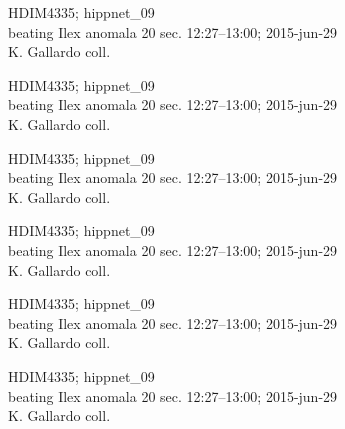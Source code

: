 \documentclass[2pt]{extarticle}
\begin{document}
\noindent
\parbox{0.16\textwidth}{\tiny \raggedright \rule[-0.3\baselineskip]{0pt}{10pt}HDIM4335; hippnet\_09\\ beating Ilex anomala 20 sec. 12:27--13:00; 2015-jun-29\\ K. Gallardo coll.}
\parbox{0.16\textwidth}{\tiny \raggedright \rule[-0.3\baselineskip]{0pt}{10pt}HDIM4335; hippnet\_09\\ beating Ilex anomala 20 sec. 12:27--13:00; 2015-jun-29\\ K. Gallardo coll.}
\parbox{0.16\textwidth}{\tiny \raggedright \rule[-0.3\baselineskip]{0pt}{10pt}HDIM4335; hippnet\_09\\ beating Ilex anomala 20 sec. 12:27--13:00; 2015-jun-29\\ K. Gallardo coll.}
\parbox{0.16\textwidth}{\tiny \raggedright \rule[-0.3\baselineskip]{0pt}{10pt}HDIM4335; hippnet\_09\\ beating Ilex anomala 20 sec. 12:27--13:00; 2015-jun-29\\ K. Gallardo coll.}
\parbox{0.16\textwidth}{\tiny \raggedright \rule[-0.3\baselineskip]{0pt}{10pt}HDIM4335; hippnet\_09\\ beating Ilex anomala 20 sec. 12:27--13:00; 2015-jun-29\\ K. Gallardo coll.}
\parbox{0.16\textwidth}{\tiny \raggedright \rule[-0.3\baselineskip]{0pt}{10pt}HDIM4335; hippnet\_09\\ beating Ilex anomala 20 sec. 12:27--13:00; 2015-jun-29\\ K. Gallardo coll.} \\ 
\vspace{0.001in} 
\end{document}

